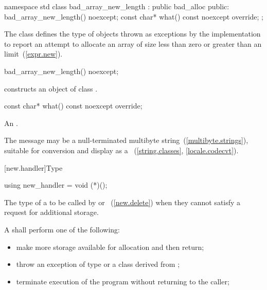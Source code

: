 \begin{codeblock}
namespace std {
  class bad_array_new_length : public bad_alloc {
  public:
    bad_array_new_length() noexcept;
    const char* what() const noexcept override;
  };
}
\end{codeblock}

\pnum
The class  defines the type of objects thrown as
exceptions by the implementation to report an attempt to allocate an array of size
less than zero or
greater than an  limit~(\ref{expr.new}).

%
\begin{itemdecl}
bad_array_new_length() noexcept;
\end{itemdecl}

\begin{itemdescr}
\pnum
\effects constructs an object of class .
\end{itemdescr}

%
%
\begin{itemdecl}
const char* what() const noexcept override;
\end{itemdecl}

\begin{itemdescr}
\pnum
\returns
An  \ntbs.

\pnum
\remarks
The message may be a null-terminated multibyte string~(\ref{multibyte.strings}),
suitable for conversion and display as a
~(\ref{string.classes}, \ref{locale.codecvt}).
\end{itemdescr}

[new.handler]{Type }

%
\begin{itemdecl}
using new_handler = void (*)();
\end{itemdecl}

\begin{itemdescr}
\pnum
The type of a
to be called by
or
~(\ref{new.delete}) when they cannot satisfy a request for additional storage.

\pnum
\required
A  shall perform one of the following:

\begin{itemize}
\item
make more storage available for allocation and then return;
\item
throw an exception of type
or a class derived from
%
;
\item
terminate execution of the program without returning to the caller;
%
%
\end{itemize}
\end{itemdescr}


